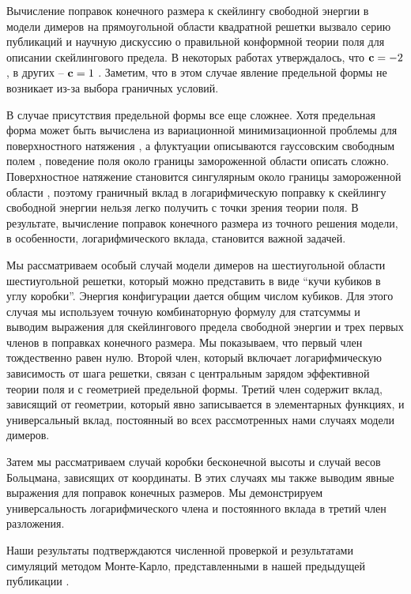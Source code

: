 \documentclass{article}
\begin{document}
Вычисление поправок конечного размера к скейлингу свободной энергии в модели димеров на
прямоугольной области квадратной решетки вызвало серию публикаций и научную дискуссию о правильной
конформной теории поля для описании скейлингового предела. В некоторых работах утверждалось, что
${\bf c}=-2$\cite{Rasmussen_2012}, в других -- ${\bf c}=1$
\cite{allegra2015exact,morin2016integrability,Sh_Izmailian_2019,izmailian2016finite,izmailian2005logarithmic}.
Заметим, что в этом случае явление предельной формы не возникает из-за выбора граничных условий. 

В случае присутствия предельной формы все еще сложнее. Хотя предельная форма может быть вычислена из
вариационной минимизационной проблемы для поверхностного натяжения
\cite{kenyon2007limit,kenyon2006dimers}, а флуктуации описываются гауссовским свободным полем
\cite{kenyon2001dominos,kenyon2008height,kenyon2009lectures}, поведение поля около границы
замороженной области описать сложно. Поверхностное натяжение становится сингулярным около границы
замороженной области \cite{kenyon2007limit}, поэтому граничный вклад в логарифмическую поправку к
скейлингу свободной энергии нельзя легко получить с точки зрения теории поля. В результате,
вычисление поправок конечного размера из точного решения модели, в особенности, логарифмического
вклада, становится важной задачей. 

Мы рассматриваем особый случай модели димеров на шестиугольной области шестиугольной решетки,
который можно представить в виде ``кучи кубиков в углу коробки''. Энергия конфигурации дается общим
числом кубиков. Для этого случая мы используем точную комбинаторную формулу для статсуммы и выводим
выражения для скейлингового предела свободной энергии и трех первых членов в поправках конечного
размера. Мы показываем, что первый член тождественно равен нулю. Второй член, который включает
логарифмическую зависимость от шага решетки, связан с центральным зарядом эффективной теории поля и
с геометрией предельной формы. Третий член содержит вклад, зависящий от геометрии, который явно
записывается в элементарных функциях, и универсальный вклад, постоянный во всех рассмотренных нами
случаях модели димеров.

Затем мы рассматриваем случай коробки бесконечной высоты и случай весов Больцмана, зависящих от
координаты. В этих случаях мы также выводим явные выражения для поправок конечных размеров. Мы
демонстрируем универсальность логарифмического члена и постоянного вклада в третий член разложения. 

Наши результаты подтверждаются численной проверкой и результатами симуляций методом Монте-Карло,
представленными в нашей предыдущей публикации \cite{1742-6596-1135-1-012024}.
\end{document}
